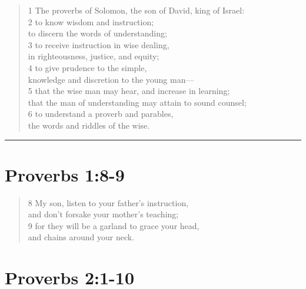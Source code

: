 \documentclass[
]{book}
\begin{document}
\begin{quote}
1 The proverbs of Solomon, the son of David, king of Israel:\\
2 to know wisdom and instruction;\\
to discern the words of understanding;\\
3 to receive instruction in wise dealing,\\
in righteousness, justice, and equity;\\
4 to give prudence to the simple,\\
knowledge and discretion to the young man---\\
5 that the wise man may hear, and increase in learning;\\
that the man of understanding may attain to sound counsel;\\
6 to understand a proverb and parables,\\
the words and riddles of the wise.
\end{quote}

\begin{center}\rule{0.5\linewidth}{0.5pt}\end{center}

\hypertarget{proverbs-18-9}{%
\section{Proverbs 1:8-9}\label{proverbs-18-9}}

\begin{quote}
8 My son, listen to your father's instruction,\\
and don't forsake your mother's teaching;\\
9 for they will be a garland to grace your head,\\
and chains around your neck.
\end{quote}

\hypertarget{proverbs-21-10}{%
\section{Proverbs 2:1-10}\label{proverbs-21-10}}
\end{document}
